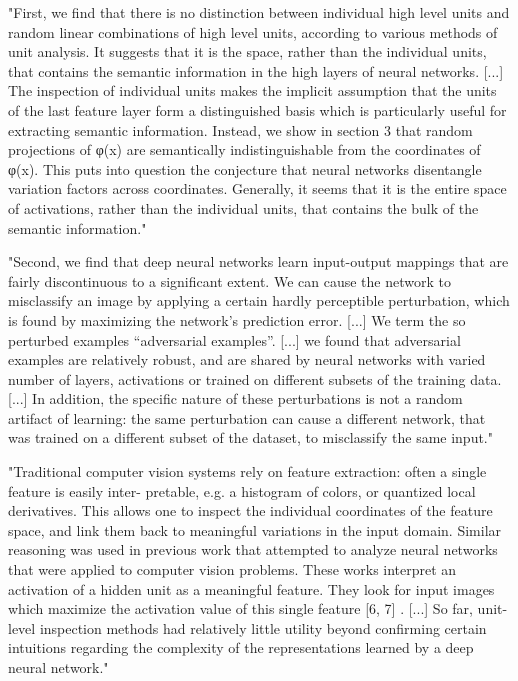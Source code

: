 \documentclass[]{scrartcl}
\begin{document}
"First, we find that there is no distinction between individual high level units and random linear combinations of high level units, according to various methods of unit analysis. It suggests that it is the space, rather than the individual units, that contains the semantic information in the high layers of neural networks.
[...]
The inspection of individual units makes the implicit assumption that the units of the last feature layer form a distinguished basis which is particularly useful for extracting semantic information. Instead, we show in section 3 that random projections of φ(x) are semantically indistinguishable from the coordinates of φ(x). This puts into question the conjecture that neural networks disentangle variation factors across coordinates. Generally, it seems that it is the entire space of activations, rather than the individual units, that contains the bulk of the semantic information." \cite{Szegedy2013}

"Second, we find that deep neural networks learn input-output mappings that are fairly discontinuous to a significant extent. We can cause the network to misclassify an image by applying a certain hardly perceptible perturbation, which is found by maximizing the network’s prediction error. [...] We term the so perturbed examples “adversarial examples”. [...] we found that adversarial examples are relatively robust, and are shared by neural networks with varied number of layers, activations or trained on different subsets of the training data.
[...]
In addition, the specific nature of these perturbations is not a random artifact of learning: the same perturbation can cause a different network, that was trained on a different subset of the dataset, to misclassify the same input." \cite{Szegedy2013}

"Traditional computer vision systems rely on feature extraction: often a single feature is easily inter- pretable, e.g. a histogram of colors, or quantized local derivatives. This allows one to inspect the individual coordinates of the feature space, and link them back to meaningful variations in the input domain. Similar reasoning was used in previous work that attempted to analyze neural networks that were applied to computer vision problems. These works interpret an activation of a hidden unit as a meaningful feature. They look for input images which maximize the activation value of this single feature [6, 7] \cite{Zeiler2014} \cite{Erhan2009}. [...] So far, unit-level inspection methods had relatively little utility beyond confirming certain intuitions regarding the complexity of the representations learned by a deep neural network." \cite{Szegedy2013}
\end{document}
